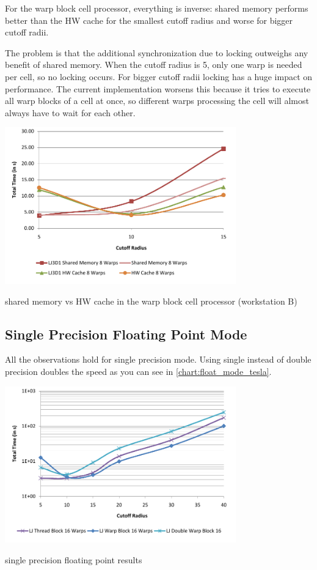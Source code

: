 For the warp block cell processor, everything is inverse: shared memory performs better than the HW cache for the smallest cutoff radius and worse for bigger cutoff radii.

The problem is that the additional synchronization due to locking outweighs any benefit of shared memory. When the cutoff radius is 5, only one warp is needed per cell, so no locking occurs. For bigger cutoff radii locking has a huge impact on performance. The current implementation worsens this because it tries to execute all warp blocks of a cell at once, so different warps processing the cell will almost always have to wait for each other.

\begin{chart}
\centering
\includegraphics[width=0.75\textwidth]{plots/wbcp_mode_comp_tesla.pdf}
\caption{shared memory vs HW cache in the warp block cell processor (workstation B)}
\label{chart:wbcp_mode_comp_tesla}
\end{chart}

\subsection{Single Precision Floating Point Mode}
All the observations hold for single precision mode. Using single instead of double precision doubles the speed as you can see in \autoref{chart:float_mode_tesla}.

\begin{chart}
\centering
\includegraphics[width=0.75\textwidth]{plots/float_mode_tesla.pdf}
\caption{single precision floating point results}
\label{chart:float_mode_tesla}
\end{chart}

